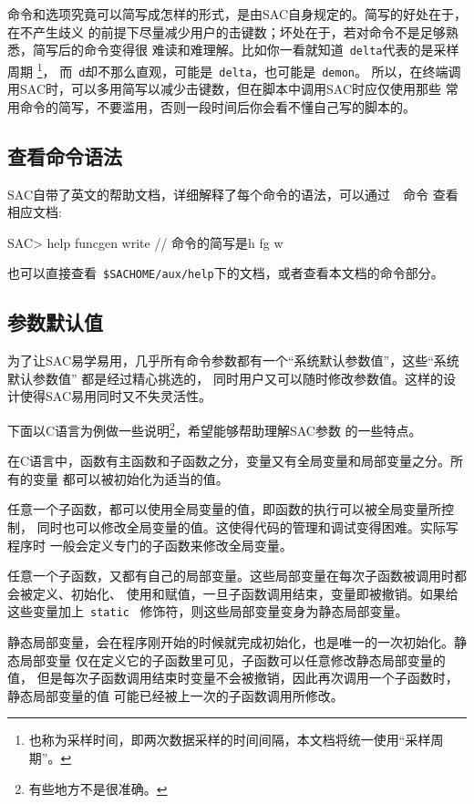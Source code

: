 命令和选项究竟可以简写成怎样的形式，是由SAC自身规定的。简写的好处在于，在不产生歧义
的前提下尽量减少用户的击键数；坏处在于，若对命令不是足够熟悉，简写后的命令变得很
难读和难理解。比如你一看就知道~\verb+delta+代表的是采样周期
\footnote{也称为采样时间，即两次数据采样的时间间隔，本文档将统一使用``采样周期''。}，
而~\verb+d+却不那么直观，可能是~\verb+delta+，也可能是~\verb+demon+。
所以，在终端调用SAC时，可以多用简写以减少击键数，但在脚本中调用SAC时应仅使用那些
常用命令的简写，不要滥用，否则一段时间后你会看不懂自己写的脚本的。

\subsection{查看命令语法}
SAC自带了英文的帮助文档，详细解释了每个命令的语法，可以通过~~命令
查看相应文档:
\begin{SACCode}
SAC> help funcgen write   // 命令的简写是h fg w
\end{SACCode}
也可以直接查看~\verb+$SACHOME/aux/help+下的文档，或者查看本文档的命令部分。

\subsection{参数默认值}
为了让SAC易学易用，几乎所有命令参数都有一个``系统默认参数值''，这些``系统默认参数值''
都是经过精心挑选的，
同时用户又可以随时修改参数值。这样的设计使得SAC易用同时又不失灵活性。

下面以C语言为例做一些说明\footnote{有些地方不是很准确。}，希望能够帮助理解SAC参数
的一些特点。

在C语言中，函数有主函数和子函数之分，变量又有全局变量和局部变量之分。所有的变量
都可以被初始化为适当的值。

任意一个子函数，都可以使用全局变量的值，即函数的执行可以被全局变量所控制，
同时也可以修改全局变量的值。这使得代码的管理和调试变得困难。实际写程序时
一般会定义专门的子函数来修改全局变量。

任意一个子函数，又都有自己的局部变量。这些局部变量在每次子函数被调用时都会被定义、初始化、
使用和赋值，一旦子函数调用结束，变量即被撤销。如果给这些变量加上~\verb+static+~
修饰符，则这些局部变量变身为静态局部变量。

静态局部变量，会在程序刚开始的时候就完成初始化，也是唯一的一次初始化。静态局部变量
仅在定义它的子函数里可见，子函数可以任意修改静态局部变量的值，
但是每次子函数调用结束时变量不会被撤销，因此再次调用一个子函数时，静态局部变量的值
可能已经被上一次的子函数调用所修改。

